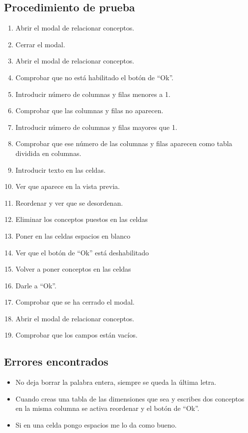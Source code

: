 \subsection{Procedimiento de prueba}
\label{procedimientoPruebas:conceptos}
\begin{enumerate}
    \item Abrir el modal de relacionar conceptos.
    \item Cerrar el modal.
    \item Abrir el modal de relacionar conceptos.
    \item Comprobar que no está habilitado el botón de ``Ok''.
    \item Introducir número de columnas y filas menores a 1.
    \item Comprobar que las columnas y filas no aparecen.
    \item Introducir número de columnas y filas mayores que 1.
    \item Comprobar que ese número de las columnas y filas aparecen como tabla dividida en columnas.
    \item Introducir texto en las celdas.
    \item Ver que aparece en la vista previa.
    \item Reordenar y ver que se desordenan.
    \item Eliminar los conceptos puestos en las celdas
    \item Poner en las celdas espacios en blanco
    \item Ver que el botón de ``Ok'' está deshabilitado
    \item Volver a poner conceptos en las celdas
    \item Darle a ``Ok''.
    \item Comprobar que se ha cerrado el modal.
    \item Abrir el modal de relacionar conceptos.
    \item Comprobar que los campos están vacíos.

\end{enumerate}


\subsection{Errores encontrados}
\label{errores:pictotra}
\begin{itemize}
    \item No deja borrar la palabra entera, siempre se queda la última letra.
    \item Cuando creas una tabla de las dimensiones que sea y escribes dos conceptos en la misma columna se activa reordenar y el botón de ``Ok''.
    \item  Si en una celda pongo espacios me lo da como bueno.

\end{itemize}

